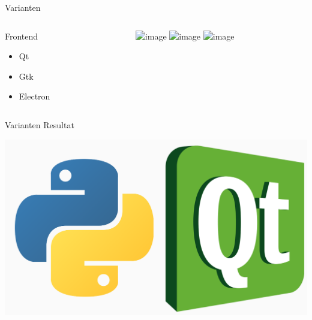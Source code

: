 \documentclass[12pt, aspectratio=1610]{beamer}
\begin{document}
\begin{frame}[label={sec:orgbf51340}]{Varianten}
\begin{columns}
\begin{column}{0.3\columnwidth}
\alert{Frontend}
\begin{itemize}
\item <2-> Qt
\item <3-> Gtk
\item <4-> Electron
\end{itemize}
\end{column}

\begin{column}{0.5\columnwidth}
\begin{center}
\includegraphics<2>[width=.9\linewidth]{pictures/frontend1.png}%
\includegraphics<3>[width=.9\linewidth]{pictures/frontend2.png}%
\includegraphics<4>[width=.9\linewidth]{pictures/frontend3.png}%
\end{center}
\end{column}
\end{columns}
\end{frame}

\begin{frame}[label={sec:org31f8c37}]{Varianten}
\alert{Resultat}

\begin{center}
\includegraphics[height=.5\textheight]{pictures/pyqt.png}
\end{center}
\end{frame}
\end{document}
